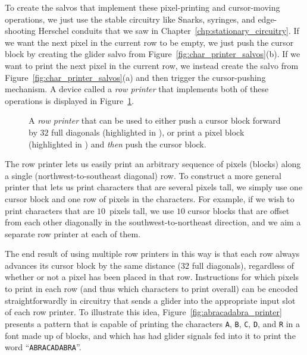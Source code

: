To create the salvos that implement these pixel-printing and cursor-moving operations, we just use the stable circuitry like Snarks, syringes, and edge-shooting Herschel conduits that we saw in Chapter~\ref{chp:stationary_circuitry}. If we want the next pixel in the current row to be empty, we just push the cursor block by creating the glider salvo from Figure~\ref{fig:char_printer_salvos}(b). If we want to print the next pixel in the current row, we instead create the salvo from Figure~\ref{fig:char_printer_salvos}(a) and then trigger the cursor-pushing mechanism. A device called a \emph{row printer} that implements both of these operations is displayed in Figure~\ref{fig:row_printer}.

\begin{figure}[!htb]
	\centering
	\caption{A \emph{row printer} that can be used to either push a cursor block forward by $32$ full diagonals (highlighted in ), or print a pixel block (highlighted in ) and \emph{then} push the cursor block.}\label{fig:row_printer}
\end{figure}

The row printer lets us easily print an arbitrary sequence of pixels (blocks) along a single (northwest-to-southeast diagonal) row. To construct a more general printer that lets us print characters that are several pixels tall, we simply use one cursor block and one row of pixels in the characters. For example, if we wish to print characters that are $10$~pixels tall, we use $10$ cursor blocks that are offset from each other diagonally in the southwest-to-northeast direction, and we aim a separate row printer at each of them.

The end result of using multiple row printers in this way is that each row always advances its cursor block by the same distance ($32$ full diagonals), regardless of whether or not a pixel has been placed in that row. Instructions for which pixels to print in each row (and thus which characters to print overall) can be encoded straightforwardly in circuitry that sends a glider into the appropriate input slot of each row printer. To illustrate this idea, Figure~\ref{fig:abracadabra_printer} presents a pattern that is capable of printing the characters \texttt{A}, \texttt{B}, \texttt{C}, \texttt{D}, and \texttt{R} in a font made up of blocks, and which has had glider signals fed into it to print the word ``\texttt{ABRACADABRA}''.

